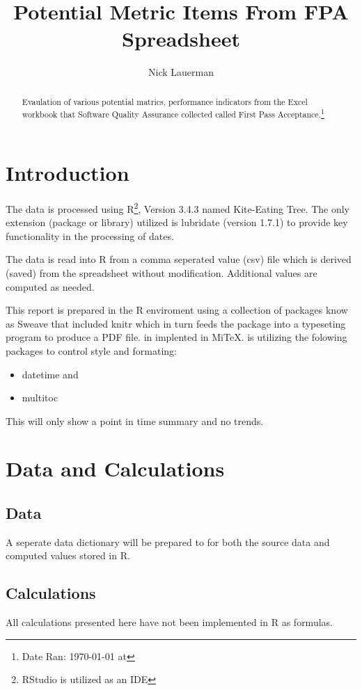 \documentclass{article}
\title{Potential Metric Items From FPA Spreadsheet}
\author{Nick Lauerman}
\date{}
\begin{document}

\maketitle

\begin{abstract}
Evaulation of various potential matrics, performance indicators from the Excel
workbook that Software Quality Assurance collected called First Pass
Acceptance.\footnote{Date Ran: \today{} at \currenttime}
\end{abstract}

\tableofcontents

\section{Introduction}
The data is processed using R\footnote{RStudio is utilized as an IDE}, Version
3.4.3 named Kite-Eating Tree. The only extension (package or library) utilized is
lubridate (version 1.7.1) to provide key functionality in the processing of dates.

The data is read into R from a comma seperated value (csv) file which is derived (saved)
from the spreadsheet without modification. Additional values are computed as needed.

This report is prepared in the R enviroment using a collection of packages know as
Sweave that included knitr which in turn feeds the package into \LaTeXe{} a typeseting
program to produce a PDF file. \LaTeXe{} in implented in Mi\TeX. \LaTeXe{} is utilizing
the folowing packages to control style and formating:
\begin{itemize}
\item datetime and
\item multitoc
\end{itemize}

This will only show a point in time summary and no trends.

\section{Data and Calculations}
\subsection{Data}
A seperate data dictionary will be prepared to for both the source data
and computed values stored in R.

\subsection{Calculations}
All calculations presented here have not been implemented in R as formulas.
\end{document}
